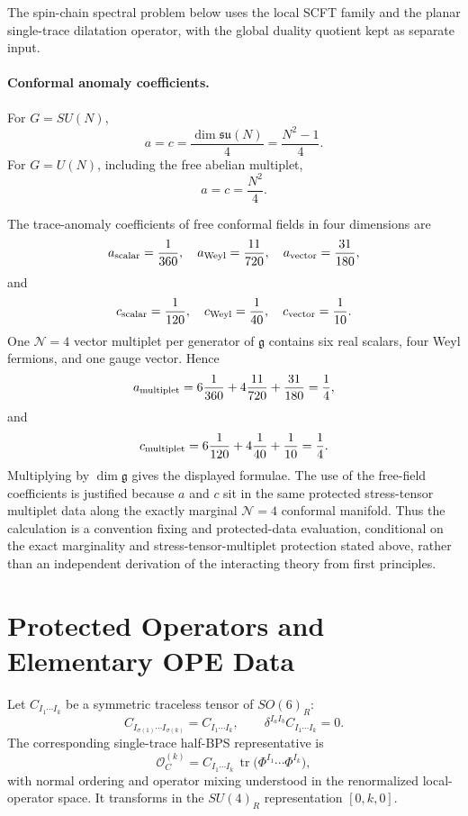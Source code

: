 The spin-chain spectral problem below uses the local SCFT family and the
planar single-trace dilatation operator, with the global duality quotient
kept as separate input.

\paragraph{Conformal anomaly coefficients.}
For \(G=SU(N)\),
\[
  a=c=\frac{\dim\mathfrak{su}(N)}{4}
      =\frac{N^2-1}{4}.
\]
For \(G=U(N)\), including the free abelian multiplet,
\[
  a=c=\frac{N^2}{4}.
\]

The trace-anomaly coefficients of free conformal fields in four dimensions
are
\[
  a_{\rm scalar}=\frac{1}{360},\quad
  a_{\rm Weyl}=\frac{11}{720},\quad
  a_{\rm vector}=\frac{31}{180},
\]
and
\[
  c_{\rm scalar}=\frac{1}{120},\quad
  c_{\rm Weyl}=\frac{1}{40},\quad
  c_{\rm vector}=\frac{1}{10}.
\]
One \(\mathcal N=4\) vector multiplet per generator of \(\mathfrak g\)
contains six real scalars, four Weyl fermions, and one gauge vector.  Hence
\[
  a_{\rm multiplet}
  =
  6\frac{1}{360}
  +4\frac{11}{720}
  +\frac{31}{180}
  =
  \frac14,
\]
and
\[
  c_{\rm multiplet}
  =
  6\frac{1}{120}
  +4\frac{1}{40}
  +\frac{1}{10}
  =
  \frac14 .
\]
Multiplying by \(\dim\mathfrak g\) gives the displayed formulae.  The use of
the free-field coefficients is justified because \(a\) and \(c\) sit in the
same protected stress-tensor multiplet data along the exactly marginal
\(\mathcal N=4\) conformal manifold.  Thus the calculation is a convention
fixing and protected-data evaluation, conditional on the exact marginality and
stress-tensor-multiplet protection stated above, rather than an independent
derivation of the interacting theory from first principles.

\section{Protected Operators and Elementary OPE Data}
\label{sec:n4-protected-operators-ope-data}

Let \(C_{I_1\cdots I_k}\) be a symmetric traceless tensor of \(SO(6)_R\):
\[
  C_{I_{\sigma(1)}\cdots I_{\sigma(k)}}=C_{I_1\cdots I_k},
  \qquad
  \delta^{I_aI_b}C_{I_1\cdots I_k}=0 .
\]
The corresponding single-trace half-BPS representative is
\[
  \mathcal O_C^{(k)}
  =
  C_{I_1\cdots I_k}\,
  \operatorname{tr}\!\bigl(
  \Phi^{I_1}\cdots\Phi^{I_k}
  \bigr),
\]
with normal ordering and operator mixing understood in the renormalized
local-operator space.  It transforms in the \(SU(4)_R\) representation
\([0,k,0]\).

